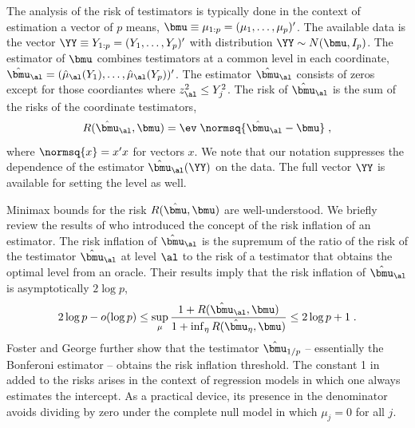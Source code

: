 \documentclass[12pt]{article}
\begin{document}
 
 The analysis of the risk of testimators is typically done in the context of
 estimation a vector of $p$ means, $\bmu \equiv \mu_{1:p} =
 (\mu_1,\ldots,\mu_p)'$.  The available data is the vector $\YY \equiv Y_{1:p} =
 (Y_1, \ldots, Y_p)'$ with distribution $\YY \sim N(\bmu,I_p)$.  The estimator
 of $\bmu$ combines testimators at a common level in each coordinate,
 $\hat{\bmu}_\al = (\hat\mu_\al(Y_1), \ldots, \hat\mu_\al(Y_p))'$.  The estimator
 $\hat{\bmu}_\al$ consists of zeros except for those coordiantes where $z_\al^2
 \le Y_j^2$.  The risk of $\hat{\bmu}_\al$ is the sum of the risks of the
 coordinate testimators,
 \begin{equation}
    R(\hat{\bmu}_\al, \bmu) 
      = \ev\; \normsq{\hat{\bmu}_\al - \bmu} \;,
 \label{eq:risk}
 \end{equation}
 where $\normsq{x} = x'x$ for vectors $x$.  We note that our notation suppresses
 the dependence of the estimator $\hat{\bmu}_\al(\YY)$ on the data.  The full
 vector $\YY$ is available for setting the level as well.


 Minimax bounds for the risk $R(\hat{\bmu},\bmu)$ are well-understood.  We briefly
 review the results of \citet{fostergeorge94} who introduced the concept of the
 risk inflation of an estimator. \citep[][obtain similar results.]
  {donohojohnstone94} The risk inflation of $\hat{\bmu}_\al$ is the supremum of
 the ratio of the risk of the testimator $\hat{\bmu}_\al$ at level $\al$ to the
 risk of a testimator that obtains the optimal level from an oracle. 
  Their results imply that the risk inflation of $\hat{\bmu}_\al$ is
 asymptotically $2 \log p$,
 \begin{equation}
    2 \log p - o(\log p) 
    \le
    \sup_\mu  \frac{1 + R(\hat{\bmu}_\al,\bmu)}
                   {1 + \inf_\eta{R(\hat{\bmu}_\eta,\bmu)}}  
    \le 
    2 \log p + 1 \;.
 \label{eq:ri}
 \end{equation}
 Foster and George further show that the testimator $\hat{\bmu}_{1/p}$ --
 essentially the Bonferoni estimator -- obtains the risk inflation threshold.
  The constant 1 in added to the risks arises in the context of regression
 models in which one always estimates the intercept.  As a practical device, its
 presence in the denominator avoids dividing by zero under the complete null
 model in which $\mu_j = 0$ for all $j$.
\end{document}
